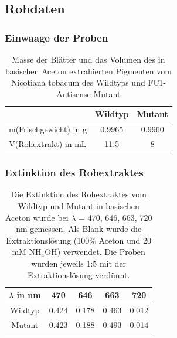 \documentclass[10pt,a4paper]{article}
\begin{document}
		\subsection{Rohdaten}
			\subsubsection{Einwaage der Proben}
				\begin{table}[H]
					\centering
					\caption{Masse der Blätter und das Volumen des in basischen Aceton extrahierten Pigmenten vom Nicotiana tobacum des Wildtyps und FC1-Antisense Mutant}
					\label{tab:Probemassen und Volumen}
					\begin{tabular}{ccc}
						\toprule
						&Wildtyp& Mutant\\
						\midrule
						m(Frischgewicht) in g & 0.9965 & 0.9960\\
						V(Rohextrakt) in mL & 11.5 & 8\\
						\bottomrule
					\end{tabular}
				\end{table}
				
			\subsubsection{Extinktion des Rohextraktes}
				\begin{table}[H]
					\centering
					\caption{Die Extinktion des Rohextraktes vom Wildtyp und Mutant in basischen Aceton wurde bei $\lambda$ = 470, 646, 663, 720 nm gemessen. Als Blank wurde die Extraktionslösung (100$\%$ Aceton und 20 mM NH$_4$OH) verwendet.
					Die Proben wurden jeweils 1:5 mit der Extraktionslösung verdünnt.}
					\label{tab:Rohdaten Extinktion Rohextraktes}
					\begin{tabular}{ccccc}
						\toprule
						$\lambda$ in nm &470& 646 & 663 & 720\\
						\midrule
						Wildtyp &0.424 & 0.178 & 0.463 & 0.012\\
						Mutant & 0.423 & 0.188 & 0.493 & 0.014 \\
						\bottomrule
					\end{tabular}
				\end{table}
			
\end{document}

